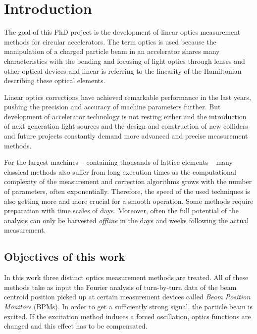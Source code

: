 \chapter*{Introduction}

\lohead{\leftmark}
\rehead{\rightmark}
\setcounter{page}{1}


The goal of this PhD project is the development of linear optics measurement methods for
circular accelerators.
The term optics is used because the manipulation of a charged particle beam in an accelerator shares
many characteristics with the bending and focusing of light optics through lenses and other optical
devices and linear is referring to the linearity of the Hamiltonian describing these optical elements.

Linear optics corrections have achieved remarkable performance in the last years,
pushing the precision and accuracy of machine parameters further.
But development of accelerator technology is not resting either and the introduction of
next generation light sources and the design and construction of new colliders and future projects
constantly demand more advanced and precise measurement methods.

For the largest machines -- containing thousands of lattice elements -- many classical methods also suffer from 
long execution times as the computational complexity of the measurement and correction algorithms grows
with the number of parameters, often exponentially. 
Therefore, the speed of the used techniques is also getting more and more crucial for a smooth operation. 
Some methods require preparation with time scales of days.
Moreover, often the full potential of the analysis can only be harvested \emph{offline} in the days and
weeks following the actual measurement.

\section{Objectives of this work}

In this work three distinct optics measurement methods are treated. All of these methods take as input the
Fourier analysis of turn-by-turn data of the beam centroid position picked up at certain measurement
devices called \emph{Beam Position Monitors} (BPMs). In order to get a sufficiently strong signal, the
particle beam is excited. If the excitation method induces a forced oscillation, optics functions are changed
and this effect has to be compensated.

